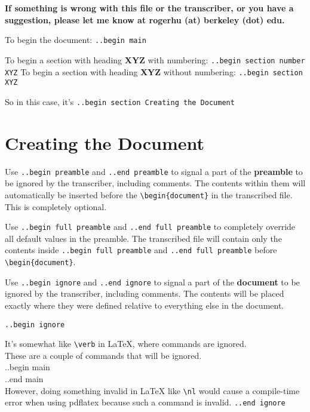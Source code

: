 \documentclass[12pt]{article}
\newcommand{\nl}{\\}
\renewcommand\bold{\textbf}
\begin{document}
\begin{flushleft}

\bold{If something is wrong with this file or the transcriber, or you have a suggestion, please let me know at rogerhu (at) berkeley (dot) edu.}

\bigskip

To begin the document: \verb|..begin main|

\bigskip

To begin a section with heading \bold{XYZ} with numbering: \verb|..begin section number XYZ|
To begin a section with heading \bold{XYZ} without numbering: \verb|..begin section XYZ|

So in this case, it's \verb|..begin section Creating the Document|

\section*{Creating the Document}

Use \verb|..begin preamble| and \verb|..end preamble| to signal a part of the \bold{preamble} to be ignored by the transcriber, including comments. The contents within them will automatically be inserted before the \verb|\begin{document}| in the transcribed file. This is completely optional.

\bigskip

Use \verb|..begin full preamble| and \verb|..end full preamble| to completely override all default values in the preamble. The transcribed file will contain only the contents inside \verb|..begin full preamble| and \verb|..end full preamble| before \verb|\begin{document}|.

\bigskip

Use \verb|..begin ignore| and \verb|..end ignore| to signal a part of the \bold{document} to be ignored by the transcriber, including comments. The contents will be placed exactly where they were defined relative to everything else in the document.

\verb|..begin ignore|

It's somewhat like \verb|\verb| in LaTeX, where commands are ignored. \\
These are a couple of commands that will be ignored. \\
..begin main \\
..end main \\
However, doing something invalid in LaTeX like \verb|\nl| would cause a compile-time error when using pdflatex because such a command is invalid. 
\verb|..end ignore|



\end{flushleft}
\end{document}
